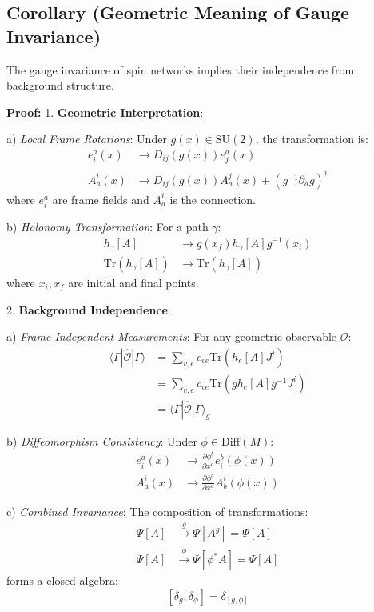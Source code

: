 \documentclass[12pt,a4paper]{article}
\begin{document}
\subsection{Corollary (Geometric Meaning of Gauge Invariance)}
The gauge invariance of spin networks implies their independence from background structure.

\textbf{Proof:}
1. \textbf{Geometric Interpretation}:
   
   a) \textit{Local Frame Rotations}:
      Under $g(x) \in \text{SU}(2)$, the transformation is:
      \[
      \begin{aligned}
      e_i^a(x) &\rightarrow D_{ij}(g(x))e_j^a(x) \\
      A_a^i(x) &\rightarrow D_{ij}(g(x))A_a^j(x) + (g^{-1}\partial_a g)^i
      \end{aligned}
      \]
      where $e_i^a$ are frame fields and $A_a^i$ is the connection.
   
   b) \textit{Holonomy Transformation}:
      For a path $\gamma$:
      \[
      \begin{aligned}
      h_\gamma[A] &\rightarrow g(x_f)h_\gamma[A]g^{-1}(x_i) \\
      \text{Tr}(h_\gamma[A]) &\rightarrow \text{Tr}(h_\gamma[A])
      \end{aligned}
      \]
      where $x_i, x_f$ are initial and final points.

2. \textbf{Background Independence}:
   
   a) \textit{Frame-Independent Measurements}:
      For any geometric observable $\mathcal{O}$:
      \[
      \begin{aligned}
      \langle\Gamma|\hat{\mathcal{O}}|\Gamma\rangle &= \sum_{v,e} c_{ve}\text{Tr}(h_e[A]J^i)\\
      &= \sum_{v,e} c_{ve}\text{Tr}(g h_e[A]g^{-1}J^i) \\
      &= \langle\Gamma|\hat{\mathcal{O}}|\Gamma\rangle_{g}
      \end{aligned}
      \]
   
   b) \textit{Diffeomorphism Consistency}:
      Under $\phi \in \text{Diff}(M)$:
      \[
      \begin{aligned}
      e_i^a(x) &\rightarrow \frac{\partial \phi^b}{\partial x^a}e_i^b(\phi(x)) \\
      A_a^i(x) &\rightarrow \frac{\partial \phi^b}{\partial x^a}A_b^i(\phi(x))
      \end{aligned}
      \]
   
   c) \textit{Combined Invariance}:
      The composition of transformations:
      \[
      \begin{aligned}
      \Psi[A] &\xrightarrow{g} \Psi[A^g] = \Psi[A] \\
      \Psi[A] &\xrightarrow{\phi} \Psi[\phi^*A] = \Psi[A]
      \end{aligned}
      \]
      forms a closed algebra:
      \[
      [\delta_g, \delta_\phi] = \delta_{[g,\phi]}
      \]
\end{document}
